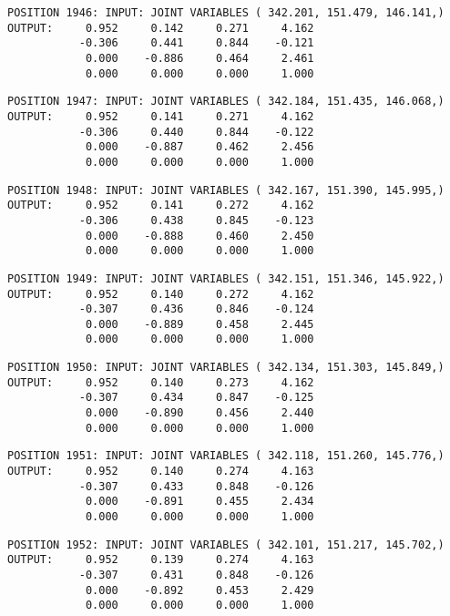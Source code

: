 \begin{verbatim}
POSITION 1946: INPUT: JOINT VARIABLES ( 342.201, 151.479, 146.141,)
OUTPUT:     0.952     0.142     0.271     4.162
           -0.306     0.441     0.844    -0.121
            0.000    -0.886     0.464     2.461
            0.000     0.000     0.000     1.000
\end{verbatim} \pagebreak[1]\begin{verbatim}
POSITION 1947: INPUT: JOINT VARIABLES ( 342.184, 151.435, 146.068,)
OUTPUT:     0.952     0.141     0.271     4.162
           -0.306     0.440     0.844    -0.122
            0.000    -0.887     0.462     2.456
            0.000     0.000     0.000     1.000
\end{verbatim} \pagebreak[1]\begin{verbatim}
POSITION 1948: INPUT: JOINT VARIABLES ( 342.167, 151.390, 145.995,)
OUTPUT:     0.952     0.141     0.272     4.162
           -0.306     0.438     0.845    -0.123
            0.000    -0.888     0.460     2.450
            0.000     0.000     0.000     1.000
\end{verbatim} \pagebreak[1]\begin{verbatim}
POSITION 1949: INPUT: JOINT VARIABLES ( 342.151, 151.346, 145.922,)
OUTPUT:     0.952     0.140     0.272     4.162
           -0.307     0.436     0.846    -0.124
            0.000    -0.889     0.458     2.445
            0.000     0.000     0.000     1.000
\end{verbatim} \pagebreak[1]\begin{verbatim}
POSITION 1950: INPUT: JOINT VARIABLES ( 342.134, 151.303, 145.849,)
OUTPUT:     0.952     0.140     0.273     4.162
           -0.307     0.434     0.847    -0.125
            0.000    -0.890     0.456     2.440
            0.000     0.000     0.000     1.000
\end{verbatim} \pagebreak[1]\begin{verbatim}
POSITION 1951: INPUT: JOINT VARIABLES ( 342.118, 151.260, 145.776,)
OUTPUT:     0.952     0.140     0.274     4.163
           -0.307     0.433     0.848    -0.126
            0.000    -0.891     0.455     2.434
            0.000     0.000     0.000     1.000
\end{verbatim} \pagebreak[1]\begin{verbatim}
POSITION 1952: INPUT: JOINT VARIABLES ( 342.101, 151.217, 145.702,)
OUTPUT:     0.952     0.139     0.274     4.163
           -0.307     0.431     0.848    -0.126
            0.000    -0.892     0.453     2.429
            0.000     0.000     0.000     1.000
\end{verbatim} \pagebreak[1]\begin{verbatim}

\end{verbatim}
